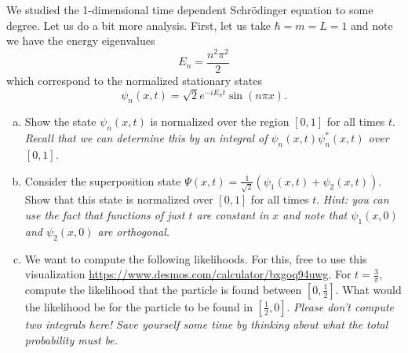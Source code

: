 \documentclass[12pt]{amsbook}
\begin{document}
\newpage
\begin{problem}
We studied the 1-dimensional time dependent Schr\"odinger equation to some degree. Let us do a bit more analysis. First, let us take $\hbar=m=L=1$ and note we have the energy eigenvalues
\[
E_n = \frac{n^2 \pi^2}{2}
\]
which correspond to the normalized stationary states
\[
\psi_n(x,t) = \sqrt{2} e^{-iE_n t} \sin(n\pi x).
\]
\begin{enumerate}[(a)]
\vspace*{0.25cm}
    \item Show the state $\psi_n(x,t)$ is normalized over the region $[0,1]$ for all times $t$. \emph{Recall that we can determine this by an integral of $\psi_n(x,t)\psi_n^*(x,t)$ over $[0,1]$.}
\vspace*{0.25cm}
    \item Consider the superposition state $\Psi(x,t) = \frac{1}{\sqrt{2}}\left( \psi_1(x,t) + \psi_2(x,t) \right)$. Show that this state is normalized over $[0,1]$ for all times $t$. \emph{Hint: you can use the fact that functions of just $t$ are constant in $x$ and note that $\psi_1(x,0)$ and $\psi_2(x,0)$ are orthogonal.}
\vspace*{0.25cm}
    \item We want to compute the following likelihoods. For this, free to use this visualization \url{https://www.desmos.com/calculator/bxgoq94uwg}. For $t=\frac{3}{\pi}$, compute the likelihood that the particle is found between $\left[0,\frac{1}{2}\right]$. What would the likelihood be for the particle to be found in $\left[\frac{1}{2}, 0\right]$. \emph{Please don't compute two integrals here! Save yourself some time by thinking about what the total probability must be.}
\end{enumerate}
\end{problem}
\end{document}
